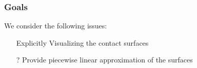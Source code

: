 \documentclass[ucs,9pt,pagenumbersfull]{beamer}
\begin{document}
\begin{frame}
\begin{columns}[c]
\begin{column}{0.38\textwidth}
\begin{minipage}[c][\textheight]{\columnwidth}
      \end{minipage}
    \end{column}
  \end{columns}
\end{frame}

\begin{frame}
  \frametitle{Goals}
  We consider the following issues:
  \begin{itemize}
  \item[\checkmark] Explicitly Visualizing the contact surfaces
  \item[?] Provide piecewise linear approximation of the surfaces
  \end{itemize}
\end{frame}
\end{document}
